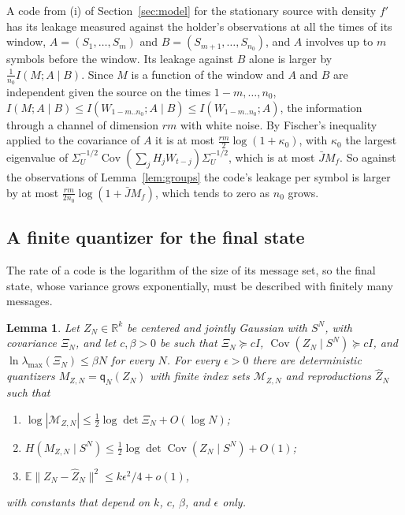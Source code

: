 \documentclass[11pt,onecolumn]{IEEEtran}
\newtheorem{lemma}[theorem]{Lemma}
\newcommand{\E}{\mathbb{E}}
\newcommand{\R}{\mathbb{R}}
\newcommand{\Cov}{\operatorname{Cov}}
\begin{document}
A code from (i) of Section~\ref{sec:model} for the stationary source
with density $f'$ has its leakage measured against the holder's
observations at all the times of its window, $A=(S_1,\dots,S_m)$ and
$B=(S_{m+1},\dots,S_{n_0})$, and $A$ involves up to $m$ symbols before the
window. Its leakage against $B$ alone is larger by
$\tfrac1{n_0}I(M;A\mid B)$. Since $M$ is a function of the window and
$A$ and $B$ are independent given the source on the times
$1-m,\dots,n_0$, $I(M;A\mid B)\le I(W_{1-m..n_0};A\mid B)\le I(W_{1-m..n_0};A)$,
the information through a channel of dimension $rm$ with white noise.
By Fischer's inequality applied to the covariance of $A$ it is at most
$\tfrac{rm}2\log(1+\kappa_0)$, with $\kappa_0$ the largest eigenvalue of
$\Sigma_U^{-1/2}\Cov(\sum_jH_jW_{t-j})\Sigma_U^{-1/2}$, which is at most
$\bar JM_f$. So against the observations of Lemma~\ref{lem:groups} the
code's leakage per symbol is larger by at most
$\tfrac{rm}{2n_0}\log(1+\bar JM_f)$, which tends to zero as $n_0$ grows.

\subsection{A finite quantizer for the final state}

The rate of a code is the logarithm of the size of its message set, so
the final state, whose variance grows exponentially, must be described
with finitely many messages.

\begin{lemma}\label{lem:quantizer}
Let $Z_N\in\R^k$ be centered and jointly Gaussian with $S^N$, with
covariance $\Xi_N$, and let $c,\beta>0$ be such that $\Xi_N\succeq cI$,
$\Cov(Z_N\mid S^N)\succeq cI$, and $\ln\lambda_{\max}(\Xi_N)\le\beta N$ for
every $N$. For every $\epsilon>0$ there are deterministic quantizers
$M_{Z,N}=\mathsf q_N(Z_N)$ with finite index sets $\mathcal M_{Z,N}$ and
reproductions $\hat Z_N$ such that
\begin{enumerate}
\item[(a)] $\log|\mathcal M_{Z,N}|\le\tfrac12\log\det\Xi_N+O(\log N)$;
\item[(b)] $H(M_{Z,N}\mid S^N)\le\tfrac12\log\det\Cov(Z_N\mid S^N)+O(1)$;
\item[(c)] $\E\|Z_N-\hat Z_N\|^2\le k\epsilon^2/4+o(1)$,
\end{enumerate}
with constants that depend on $k$, $c$, $\beta$, and $\epsilon$ only.
\end{lemma}
\end{document}
